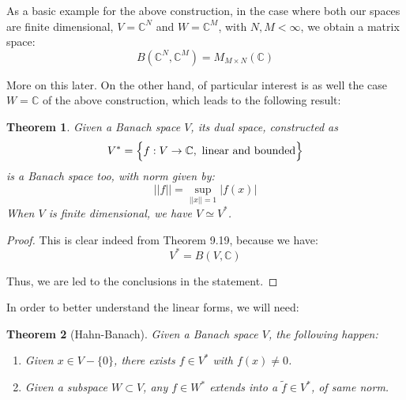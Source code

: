 \documentclass[12pt]{amsbook}
\newtheorem{theorem}{Theorem}[chapter]
\begin{document}
As a basic example for the above construction, in the case where both our spaces are finite dimensional, $V=\mathbb C^N$ and $W=\mathbb C^M$, with $N,M<\infty$, we obtain a matrix space:
$$B(\mathbb C^N,\mathbb C^M)=M_{M\times N}(\mathbb C)$$

More on this later. On the other hand, of particular interest is as well the case $W=\mathbb C$ of the above construction, which leads to the following result:


\begin{theorem}
Given a Banach space $V$, its dual space, constructed as
$$V^*=\Big\{f:V\to\mathbb C,\ {\rm linear\ and\ bounded}\Big\}$$
is a Banach space too, with norm given by:
$$||f||=\sup_{||x||=1}|f(x)|$$
When $V$ is finite dimensional, we have $V\simeq V^*$.
\end{theorem}

\begin{proof}
This is clear indeed from Theorem 9.19, because we have:
$$V^*=B(V,\mathbb C)$$

Thus, we are led to the conclusions in the statement.
\end{proof}

In order to better understand the linear forms, we will need:

\begin{theorem}[Hahn-Banach]
Given a Banach space $V$, the following happen:
\begin{enumerate}
\item Given $x\in V-\{0\}$, there exists $f\in V^*$ with $f(x)\neq0$.

\item Given a subspace $W\subset V$, any $f\in W^*$ extends into a $\tilde{f}\in V^*$, of same norm.
\end{enumerate}
\end{theorem}
\end{document}
